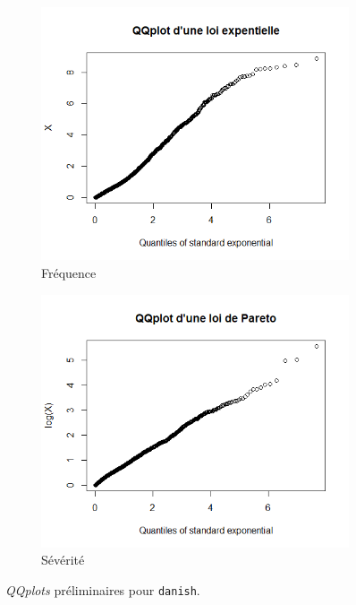 		\begin{figure}[H]
			\begin{center}
				\begin{subfigure}[b]{0.5\textwidth}
					\includegraphics[scale=0.45]{Graphiques/QQplot_Exp_Danish} 
					\caption{Fréquence} \label{QQplot_Exp_Danish}
				\end{subfigure}
				\begin{subfigure}[b]{0.4\textwidth}
					\includegraphics[scale=0.45]{Graphiques/QQplot_Pareto_Danish} 
					\caption{Sévérité} \label{QQplot_Pareto_Danish}
				\end{subfigure}
				\renewcommand{\figurename}{Illustration}
				\caption{\textit{QQplots} préliminaires pour \texttt{danish}.}
			\end{center}
		\end{figure}
		
